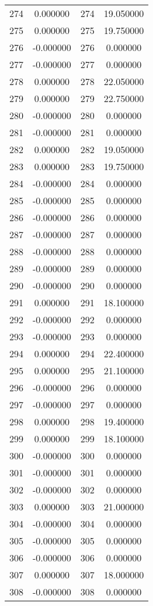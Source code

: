 \documentclass[12pt]{article}
\begin{document}
\begin{longtable}{@{}cccc@{}}
274 & 0.000000 & 274 & 19.050000 \\
275 & 0.000000 & 275 & 19.750000 \\
276 & -0.000000 & 276 & 0.000000 \\
277 & -0.000000 & 277 & 0.000000 \\
278 & 0.000000 & 278 & 22.050000 \\
279 & 0.000000 & 279 & 22.750000 \\
280 & -0.000000 & 280 & 0.000000 \\
281 & -0.000000 & 281 & 0.000000 \\
282 & 0.000000 & 282 & 19.050000 \\
283 & 0.000000 & 283 & 19.750000 \\
284 & -0.000000 & 284 & 0.000000 \\
285 & -0.000000 & 285 & 0.000000 \\
286 & -0.000000 & 286 & 0.000000 \\
287 & -0.000000 & 287 & 0.000000 \\
288 & -0.000000 & 288 & 0.000000 \\
289 & -0.000000 & 289 & 0.000000 \\
290 & -0.000000 & 290 & 0.000000 \\
291 & 0.000000 & 291 & 18.100000 \\
292 & -0.000000 & 292 & 0.000000 \\
293 & -0.000000 & 293 & 0.000000 \\
294 & 0.000000 & 294 & 22.400000 \\
295 & 0.000000 & 295 & 21.100000 \\
296 & -0.000000 & 296 & 0.000000 \\
297 & -0.000000 & 297 & 0.000000 \\
298 & 0.000000 & 298 & 19.400000 \\
299 & 0.000000 & 299 & 18.100000 \\
300 & -0.000000 & 300 & 0.000000 \\
301 & -0.000000 & 301 & 0.000000 \\
302 & -0.000000 & 302 & 0.000000 \\
303 & 0.000000 & 303 & 21.000000 \\
304 & -0.000000 & 304 & 0.000000 \\
305 & -0.000000 & 305 & 0.000000 \\
306 & -0.000000 & 306 & 0.000000 \\
307 & 0.000000 & 307 & 18.000000 \\
308 & -0.000000 & 308 & 0.000000 \\

\end{longtable}
\end{document}

